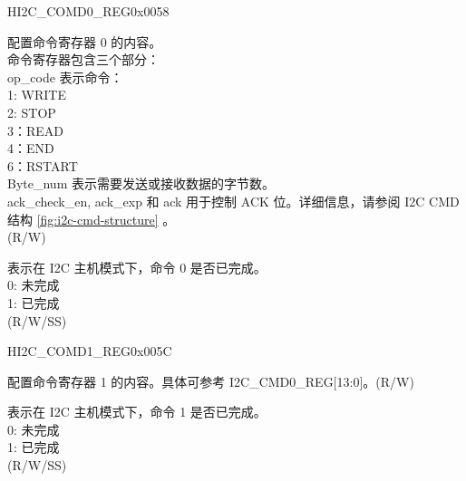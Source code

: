 \begin{register}{H}{I2C\_COMD0\_REG}{0x0058}\label{regdesc:I2CCOMD0REG}
%
%
%
\regnewline%
\begin{regdesc}\begin{reglist}
\label{fielddesc:I2CCOMMAND0}\item [I2C\_COMMAND0] 配置命令寄存器 0 的内容。 \\
命令寄存器包含三个部分：\\ 
op\_code 表示命令：\\
1: WRITE\\ 
2: STOP\\
3：READ\\
4：END\\
6：RSTART\\
Byte\_num 表示需要发送或接收数据的字节数。\\
ack\_check\_en, ack\_exp 和 ack 用于控制 ACK 位。详细信息，请参阅 I2C CMD 结构 \ref{fig:i2c-cmd-structure} 。\\(R/W)
\label{fielddesc:I2CCOMMAND0DONE}\item [I2C\_COMMAND0\_DONE] 表示在 I2C 主机模式下，命令 0 是否已完成。\\
0: 未完成\\
1: 已完成 \\ (R/W/SS)
\end{reglist}\end{regdesc}
\end{register}


\begin{register}{H}{I2C\_COMD1\_REG}{0x005C}\label{regdesc:I2CCOMD1REG}
%
%
%
\regnewline%
\begin{regdesc}\begin{reglist}
\label{fielddesc:I2CCOMMAND1}\item [I2C\_COMMAND1] 配置命令寄存器 1 的内容。具体可参考 I2C\_CMD0\_REG[13:0]。(R/W)
\label{fielddesc:I2CCOMMAND1DONE}\item [I2C\_COMMAND1\_DONE] 表示在 I2C 主机模式下，命令 1 是否已完成。\\
0: 未完成\\
1: 已完成 \\ (R/W/SS)
\end{reglist}\end{regdesc}
\end{register}


